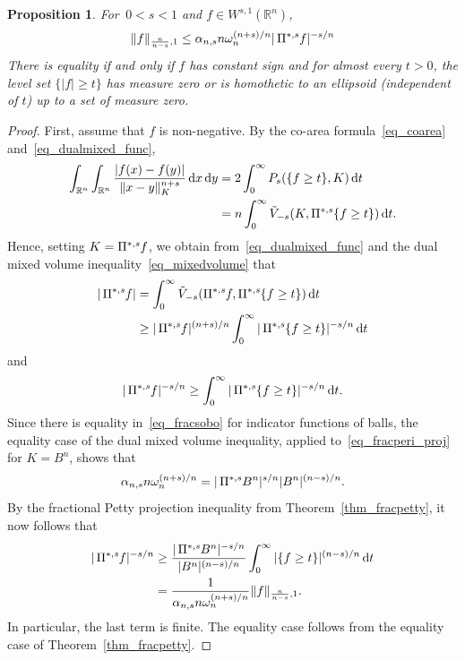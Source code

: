 \documentclass{amsart}
\newtheorem{proposition}[theorem]{Proposition}
\newcommand{\ofpp}[1]{\operatorname{\Pi^{\ast,{\it #1}}}\!}
\newcommand{\Bvtex}{{B^n}}
\newcommand{\dvtex}{\,\mathrm{d}}
\newcommand{\vol}[1]{ \vert #1\vert}
\begin{document}
\begin{proposition}
\label{thm_afracsobolorenz}
For $\,0<s<1$ and $f\in W^{s,1}(\mathbb R^{n})$,
%
\begin{equation}
\Vert f\Vert _{\frac{n}{n-s},1} \le \alpha _{n,s} n \omega _{n}^{({n+s})/n}
\vol{\ofpp{s} f}^{- s/ n}
\nonumber \end{equation}
%
There is equality if and only if $f$ has constant sign and for almost every
$t>0$, the level set $\{\vert f\vert \geq t\}$ has measure zero or is homothetic
to an ellipsoid (independent of $t$) up to a set of measure zero.
\end{proposition}
%
\begin{proof}
First, assume that $f$ is non-negative. By the co-area formula~\eqref{eq_coarea} and~\eqref{eq_dualmixed_func},
%
\begin{align}
\int _{\mathbb R^{n}}\int _{\mathbb R^{n}}
\frac{\vert f(x)-f(y)\vert}{\Vert x-y\Vert _{K}^{n+s}}\dvtex x\dvtex y &= 2
\int _{0}^{\infty }P_{s}(\{f \ge t\}, K)\dvtex t
\nonumber \\
&= n\int _{0}^{\infty }\tilde V_{-s}(K, \ofpp{s}\,\{f \ge t\})\dvtex t.
\nonumber \end{align}
%
Hence, setting $K= \ofpp{s}f$, we obtain from~\eqref{eq_dualmixed_func} and the dual mixed volume inequality~\eqref{eq_mixedvolume} that
%
\begin{align}
\vol{\ofpp{s} f} &= \int _{0}^{\infty }\tilde V_{-s}(\ofpp{s} f,
\ofpp{s} \,\{f \ge t\}) \dvtex t
\nonumber \\
&\ge \vol{\ofpp{s} f}^{({n+s})/n} \int _{0}^{\infty }
\vol{\ofpp{s} \,\{f \ge t\}}^{-s/n}\dvtex t
\nonumber \end{align}
%
and
%
\begin{equation}
\vol{\ofpp{s} f}^{-s/n}\ge \int _{0}^{\infty }
\vol{ \ofpp{s} \,\{f \ge t\}}^{-s/n} \dvtex t.
\nonumber \end{equation}
%
Since there is equality in~\eqref{eq_fracsobo} for indicator functions
of balls, the equality case of the dual mixed volume inequality, applied
to~\eqref{eq_fracperi_proj} for $K=\Bvtex $, shows that
%
\begin{equation*}
{\alpha _{n,s} n \omega _{n}^{({n+s})/n}} =\vol{\ofpp s\Bvtex}^{s/n}{
\vol{\Bvtex}^{({n-s})/n}}.
\end{equation*}
%
By the fractional Petty projection inequality from Theorem~\ref{thm_fracpetty}, it now follows that
%
\begin{equation}
\label{eq_frcpetty}
%
\begin{split} \vol{\ofpp{s} f}^{- s/ n} &\ge
\frac{\vol{\ofpp s\Bvtex}^{-s/n}}{\vol{\Bvtex}^{({n-s})/n}} \int _{0}^{
\infty }\vert \{f \ge t\}\vert ^{(n-s)/n}\dvtex t
\\
&= \frac {1} {\alpha _{n,s} n \omega _{n}^{({n+s})/n}} \|f\|_{
\frac{n}{n-s},1}.
\end{split}
%
\end{equation}
%
In particular, the last term is finite. The equality case follows from
the equality case of Theorem~\ref{thm_fracpetty}.


\end{proof}
\end{document}
